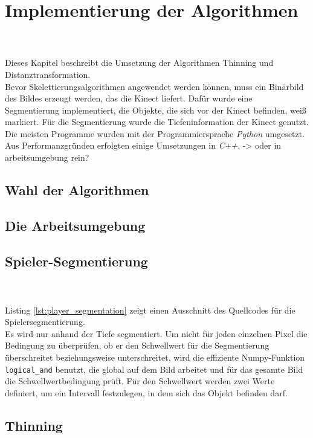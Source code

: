 \chapter{Implementierung der Algorithmen}
\\\\
Dieses Kapitel beschreibt die Umsetzung der Algorithmen Thinning und Distanztransformation.\\
Bevor Skelettierungsalgorithmen angewendet werden können, muss ein Binärbild des Bildes erzeugt werden, 
das die Kinect liefert. Dafür wurde eine Segmentierung implementiert, die Objekte, die sich vor der
Kinect befinden, weiß markiert. Für die Segmentierung wurde die Tiefeninformation der Kinect genutzt.\\
Die meisten Programme wurden mit der Programmiersprache \emph{Python} umgesetzt. Aus Performanzgründen 
erfolgten einige Umsetzungen in \emph{C++}. -> oder in arbeitsumgebung rein?
\section{Wahl der Algorithmen}
\section{Die Arbeitsumgebung}
\section{Spieler-Segmentierung}
\\\\
Listing \ref{lst:player_segmentation} zeigt einen Ausschnitt des Quellcodes für die Spielersegmentierung.\\
Es wird nur anhand der Tiefe segmentiert. Um nicht für jeden einzelnen Pixel die Bedingung zu überprüfen, ob er den Schwellwert für die Segmentierung überschreitet beziehungsweise unterschreitet, wird die effiziente Numpy-Funktion \texttt{logical\_and} benutzt, die global auf dem Bild arbeitet und für das gesamte Bild die Schwellwertbedingung prüft. Für den Schwellwert werden zwei 
Werte definiert, um ein Intervall festzulegen, in dem sich das Objekt befinden darf. 
\section{Thinning}  %
